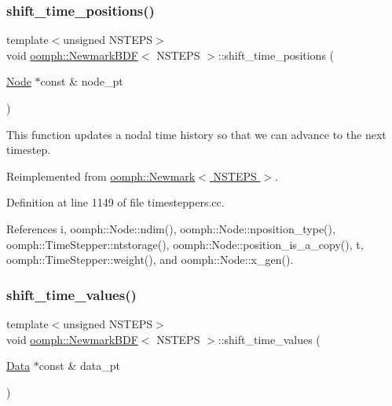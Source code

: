 \subsubsection{\texorpdfstring{shift\+\_\+time\+\_\+positions()}{shift\_time\_positions()}}
{\footnotesize\ttfamily template$<$unsigned N\+S\+T\+E\+PS$>$ \\
void \hyperlink{classoomph_1_1NewmarkBDF}{oomph\+::\+Newmark\+B\+DF}$<$ N\+S\+T\+E\+PS $>$\+::shift\+\_\+time\+\_\+positions (\begin{DoxyParamCaption}\item[{\hyperlink{classoomph_1_1Node}{Node} $\ast$const \&}]{node\+\_\+pt }\end{DoxyParamCaption})\hspace{0.3cm}{\ttfamily [virtual]}}



This function updates a nodal time history so that we can advance to the next timestep. 



Reimplemented from \hyperlink{classoomph_1_1Newmark_af56a2965f66e9a181b336e11cc613b21}{oomph\+::\+Newmark$<$ N\+S\+T\+E\+P\+S $>$}.



Definition at line 1149 of file timesteppers.\+cc.



References i, oomph\+::\+Node\+::ndim(), oomph\+::\+Node\+::nposition\+\_\+type(), oomph\+::\+Time\+Stepper\+::ntstorage(), oomph\+::\+Node\+::position\+\_\+is\+\_\+a\+\_\+copy(), t, oomph\+::\+Time\+Stepper\+::weight(), and oomph\+::\+Node\+::x\+\_\+gen().

\mbox{\label{classoomph_1_1NewmarkBDF_a4726c0ea901167bc2124c63bf6e5f692}} 
\subsubsection{\texorpdfstring{shift\+\_\+time\+\_\+values()}{shift\_time\_values()}}
{\footnotesize\ttfamily template$<$unsigned N\+S\+T\+E\+PS$>$ \\
void \hyperlink{classoomph_1_1NewmarkBDF}{oomph\+::\+Newmark\+B\+DF}$<$ N\+S\+T\+E\+PS $>$\+::shift\+\_\+time\+\_\+values (\begin{DoxyParamCaption}\item[{\hyperlink{classoomph_1_1Data}{Data} $\ast$const \&}]{data\+\_\+pt }\end{DoxyParamCaption})\hspace{0.3cm}{\ttfamily [virtual]}}



